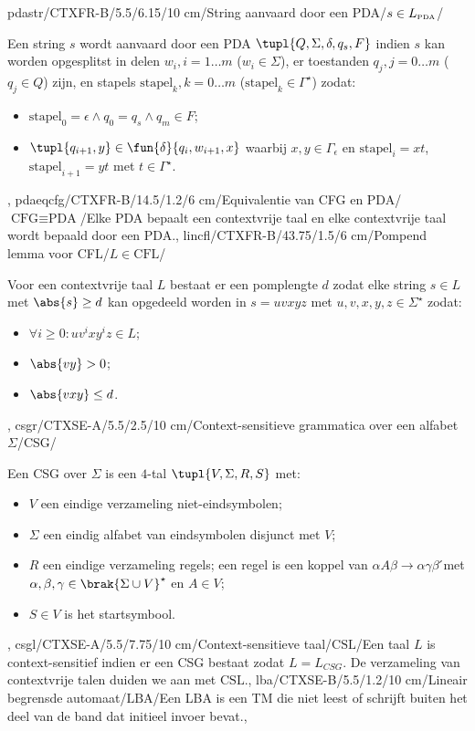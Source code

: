pdastr/CTXFR-B/5.5/6.15/10 cm/String aanvaard door een PDA/$s\in L_{\mbox{\tiny PDA}}$/{Een string $s$ wordt aanvaard door een PDA $\tupl{Q,\Sigma,\delta,q_s,F}$ indien $s$ kan worden opgesplitst in delen $w_i,i=1\ldots m$ ($w_i\in\Sigma$), er toestanden $q_j,j=0\ldots m$ ($q_j\in Q$) zijn, en stapels $\mbox{stapel}_k,k=0\ldots m$ ($\mbox{stapel}_k\in\Gamma^{\star}$) zodat:\begin{itemize}\item $\mbox{stapel}_0=\epsilon\wedge q_0=q_s\wedge q_m\in F$;\item $\tupl{q_{i+1},y}\in\fun{\delta}{q_i,w_{i+1},x}$ waarbij $x,y\in\Gamma_{\epsilon}$ en $\mbox{stapel}_i=xt$, $\mbox{stapel}_{i+1}=yt$ met $t\in\Gamma^{\star}$.\end{itemize}},
pdaeqcfg/CTXFR-B/14.5/1.2/6 cm/Equivalentie van CFG en PDA/$\mbox{CFG}\equiv\mbox{PDA}$/{Elke PDA bepaalt een contextvrije taal en elke contextvrije taal wordt bepaald door een PDA.},
lincfl/CTXFR-B/43.75/1.5/6 cm/Pompend lemma voor CFL/$L\in\mbox{CFL}$/{Voor een contextvrije taal $L$ bestaat er een pomplengte $d$ zodat elke string $s\in L$ met $\abs{s}\geq d$ kan opgedeeld worden in $s=uvxyz$ met $u,v,x,y,z\in\Sigma^{\star}$ zodat:\begin{itemize}\item $\forall i\geq 0:uv^ixy^iz\in L$;\item $\abs{vy}>0$;\item $\abs{vxy}\leq d$.\end{itemize}},
csgr/CTXSE-A/5.5/2.5/10 cm/Context-sensitieve grammatica over een alfabet $\Sigma$/CSG/{Een CSG over $\Sigma$ is een $4$-tal $\tupl{V,\Sigma,R,S}$ met:\begin{itemize}\item $V$ een eindige verzameling niet-eindsymbolen;\item $\Sigma$ een eindig alfabet van eindsymbolen disjunct met $V$;\item $R$ een eindige verzameling regels; een regel is een koppel van $\alpha A\beta\rightarrow\alpha\gamma\beta$ ́met $\alpha,\beta,\gamma\in\brak{\Sigma\cup V}^{\star}$ en $A\in V$;\item $S\in V$ is het startsymbool.\end{itemize}},
csgl/CTXSE-A/5.5/7.75/10 cm/Context-sensitieve taal/$\mbox{CSL}$/{Een taal $L$ is context-sensitief indien er een CSG bestaat zodat $L=L_{CSG}$. De verzameling van contextvrije talen duiden we aan met $\mbox{CSL}$.},
lba/CTXSE-B/5.5/1.2/10 cm/Lineair begrensde automaat/$\mbox{LBA}$/{Een LBA is een TM die niet leest of schrijft buiten het deel van de band dat initieel invoer bevat.},
